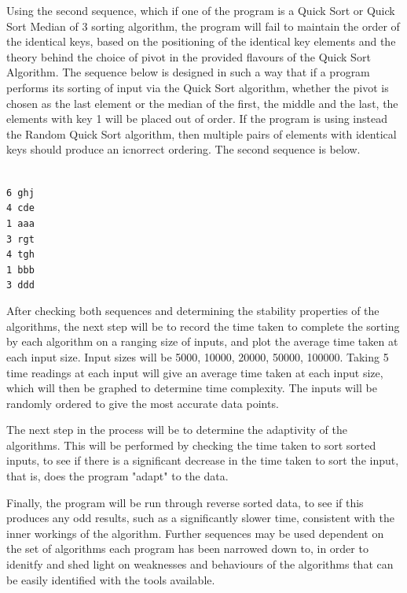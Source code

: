 \documentclass[a4paper]{article}
\newcommand{\code}{\texttt}
\begin{document}
Using the second sequence, which if one of the program is a Quick Sort or Quick Sort Median of 3 sorting algorithm, the program will fail to maintain the order of the identical keys, based on the positioning of the identical key elements and the theory behind the choice of pivot in the provided flavours of the Quick Sort Algorithm. The sequence below is designed in such a way that if a program performs its sorting of input via the Quick Sort algorithm, whether the pivot is chosen as the last element or the median of the first, the middle and the last, the elements with key 1 will be placed out of order. If the program is using instead the Random Quick Sort algorithm, then multiple pairs of elements with identical keys should produce an icnorrect ordering. The second sequence is below.
\begin{tabbing}
\hspace{10mm} \= \\ 
\> \code{6 ghj}\\
\> \code{4 cde}\\
\> \code{1 aaa}\\
\> \code{3 rgt}\\
\> \code{4 tgh}\\
\> \code{1 bbb}\\
\> \code{3 ddd}\\
\end{tabbing}

After checking both sequences and determining the stability properties of the algorithms, the next step will be to record the time taken to complete the sorting by each algorithm on a ranging size of inputs, and plot the average time taken at each input size. Input sizes will be 5000, 10000, 20000, 50000, 100000. Taking 5 time readings at each input will give an average time taken at each input size, which will then be graphed to determine time complexity. The inputs will be randomly ordered to give the most accurate data points.

The next step in the process will be to determine the adaptivity of the algorithms. This will be performed by checking the time taken to sort sorted inputs, to see if there is a significant decrease in the time taken to sort the input, that is, does the program "adapt" to the data.

Finally, the program will be run through reverse sorted data, to see if this produces any odd results, such as a significantly slower time, consistent with the inner workings of the algorithm. Further sequences may be used dependent on the set of algorithms each program has been narrowed down to, in order to idenitfy and shed light on weaknesses and behaviours of the algorithms that can be easily identified with the tools available.
\end{document}
